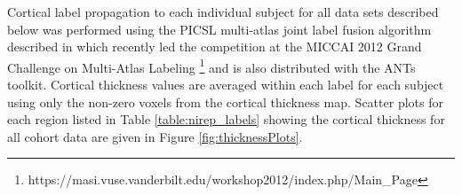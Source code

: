Cortical label propagation to each individual subject for all data sets
described below was performed using the PICSL multi-atlas joint label fusion
algorithm described in \cite{wang2013} which recently led the competition
at the MICCAI 2012 Grand Challenge on Multi-Atlas Labeling%
\footnote{
https://masi.vuse.vanderbilt.edu/workshop2012/index.php/Main\_Page
}
and is also 
distributed with the ANTs toolkit.  Cortical thickness values are averaged
within each label for each subject using only the non-zero voxels from the cortical thickness map.  Scatter plots for each region listed in Table \ref{table:nirep_labels}
showing the cortical thickness for all cohort data are given in Figure \ref{fig:thicknessPlots}.


